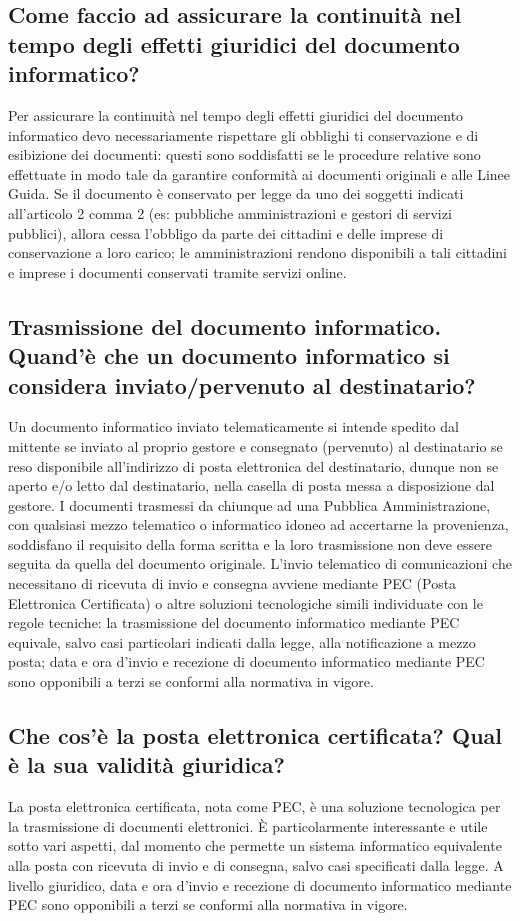 \subsection{Come faccio ad assicurare la continuità nel tempo degli effetti giuridici del documento informatico?}
Per assicurare la continuità nel tempo degli effetti giuridici del documento informatico
devo necessariamente rispettare gli obblighi ti conservazione e di esibizione dei documenti:
questi sono soddisfatti se le procedure relative sono effettuate in modo tale da garantire
conformità ai documenti originali e alle Linee Guida.
\newline
Se il documento è conservato per legge da uno dei soggetti indicati all'articolo 2
comma 2 (es: pubbliche amministrazioni e gestori di servizi pubblici), allora cessa l'obbligo
da parte dei cittadini e delle imprese di conservazione a loro carico; le amministrazioni
rendono disponibili a tali cittadini e imprese i documenti conservati tramite servizi online.

\subsection{Trasmissione del documento informatico. Quand'è che un documento informatico si considera inviato/pervenuto al destinatario?}
Un documento informatico inviato telematicamente si intende spedito dal mittente
se inviato al proprio gestore e consegnato (pervenuto) al destinatario se reso disponibile
all'indirizzo di posta elettronica del destinatario, dunque non se aperto e/o letto dal destinatario,
nella casella di posta messa a disposizione dal gestore. I documenti trasmessi da chiunque
ad una Pubblica Amministrazione, con qualsiasi mezzo telematico o informatico idoneo ad accertarne la provenienza,
soddisfano il requisito della forma scritta e la loro trasmissione non deve essere seguita
da quella del documento originale. L'invio telematico di comunicazioni che necessitano di
ricevuta di invio e consegna avviene mediante PEC (Posta Elettronica Certificata)
o altre soluzioni tecnologiche simili individuate con le regole tecniche:
la trasmissione del documento informatico mediante PEC equivale,
salvo casi particolari indicati dalla legge, alla notificazione a mezzo posta;
data e ora d'invio e recezione di documento informatico mediante PEC sono opponibili a terzi se conformi alla normativa in vigore.

\subsection{Che cos'è la posta elettronica certificata? Qual è la sua validità giuridica?}
La posta elettronica certificata, nota come PEC, è una soluzione tecnologica per
la trasmissione di documenti elettronici.
È particolarmente interessante e utile sotto vari aspetti, dal momento che
permette un sistema informatico equivalente alla posta con ricevuta di invio e di consegna,
salvo casi specificati dalla legge. A livello giuridico, data e ora d'invio e recezione
di documento informatico mediante PEC sono opponibili a terzi se conformi alla normativa in vigore.

